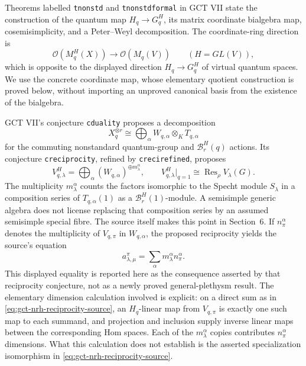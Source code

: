 Theorems labelled \texttt{tnonstd} and \texttt{tnonstdformal} in GCT VII
state the construction of the quantum map $H_q\to G_q^H$, its matrix
coordinate bialgebra map, cosemisimplicity, and a Peter--Weyl decomposition.
The coordinate-ring direction is
\[
 \mathcal O(M_q^H(X))\longrightarrow\mathcal O(M_q(V))
 \qquad(H=GL(V)),
\]
which is opposite to the displayed direction $H_q\to G_q^H$ of virtual
quantum spaces.  We use the concrete coordinate map, whose elementary
quotient construction is proved below, without importing an unproved
canonical basis from the existence of the bialgebra.

GCT VII's conjecture \texttt{cduality} proposes a decomposition
\begin{equation}\label{eq:gct-nrh-duality-source}
 X_q^{\otimes r}
   \cong\bigoplus_\alpha W_{q,\alpha}\otimes_K T_{q,\alpha}
\end{equation}
for the commuting nonstandard quantum-group and
$\mathcal B_r^H(q)$ actions.  Its conjecture \texttt{creciprocity}, refined
by \texttt{crecirefined}, proposes
\begin{equation}\label{eq:gct-nrh-reciprocity-source}
 V_{q,\lambda}^{H}=\bigoplus_\alpha
                 (W_{q,\alpha})^{\oplus m_\lambda^\alpha},
 \qquad
 V_{q,\lambda}^{H}\big|_{q=1}
       \cong\operatorname{Res}_{\rho}V_\lambda(G).
\end{equation}
The multiplicity $m_\lambda^\alpha$ counts the factors isomorphic to the
Specht module $S_\lambda$ in a composition series of
$T_{q,\alpha}(1)$ as a $\mathcal B_r^H(1)$-module.  A semisimple generic
algebra does not license replacing that composition series by an assumed
semisimple special fibre.  The source itself makes this point in
Section~6.  If $n_\pi^\alpha$ denotes the multiplicity of $V_{q,\pi}$ in
$W_{q,\alpha}$, the proposed reciprocity yields the source's equation
\begin{equation}\label{eq:gct-nrh-multiplicities-source}
 a_{\lambda,\mu}^{\pi}
       =\sum_\alpha m_\lambda^\alpha n_\pi^\alpha.
\end{equation}
This displayed equality is reported here as the consequence asserted by
that reciprocity conjecture, not as a newly proved general-plethysm result.
The elementary dimension calculation involved is explicit: on a direct
sum as in \eqref{eq:gct-nrh-reciprocity-source}, an $H_q$-linear map from
$V_{q,\pi}$ is exactly one such map to each summand, and projection and
inclusion supply inverse linear maps between the corresponding Hom spaces.
Each of the $m_\lambda^\alpha$ copies contributes
$n_\pi^\alpha$ dimensions.  What this calculation does not establish is
the asserted specialization isomorphism in
\eqref{eq:gct-nrh-reciprocity-source}.

